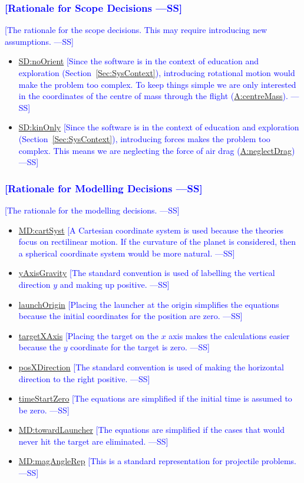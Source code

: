 \documentclass[12pt]{article}
\newcommand{\authornote}[3]{\textcolor{#1}{[#3 ---#2]}}
\newcommand{\authornote}[3]{}
\newcommand{\wss}[1]{\authornote{blue}{SS}{#1}}
\begin{document}
\subsubsection{\wss{Rationale for Scope Decisions}} \label{Sec:SDRationale}

\wss{The rationale for the scope decisions.  This may require introducing
new assumptions.}

\begin{itemize}
\item \hyperref[SD:noOrient]{SD:noOrient} \wss{Since the software is in the
context of education and exploration (Section~\ref{Sec:SysContext}), introducing
rotational motion would make the problem too complex. To keep things simple we
are only interested in the coordinates of the centre of mass through the
flight (\hyperref[centreMass]{A:centreMass}).}
\item \hyperref[SD:kinOnly]{SD:kinOnly} \wss{Since the software is in the
context of education and exploration (Section~\ref{Sec:SysContext}), introducing
forces makes the problem too complex. This means we are neglecting the force of air drag (\hyperref[neglectDrag]{A:neglectDrag})} 
\end{itemize}

\subsubsection{\wss{Rationale for Modelling Decisions}} \label{Sec:MDRationale}

\wss{The rationale for the modelling decisions.}

\begin{itemize}
\item \hyperref[MD:cartSyst]{MD:cartSyst} \wss{A Cartesian coordinate system is
used because the theories focus on rectilinear motion.  If the curvature of the
planet is considered, then a spherical coordinate system would be more natural.}
\item \hyperref[yAxisGravity]{yAxisGravity} \wss{The standard convention is used of labelling the vertical direction $y$ and making up positive.}
\item \hyperref[launchOrigin]{launchOrigin} \wss{Placing the launcher at the origin simplifies the equations because the initial coordinates for the position are zero.}
\item \hyperref[targetXAxis]{targetXAxis} \wss{Placing the target on the $x$ axis makes the calculations easier because the $y$ coordinate for the target is zero.}
\item \hyperref[posXDirection]{posXDirection} \wss{The standard convention is used of making the horizontal direction to the right positive.}
\item \hyperref[timeStartZero]{timeStartZero} \wss{The equations are simplified if the initial time is assumed to be zero.}
\item \hyperref[MD:towardLauncher]{MD:towardLauncher} \wss{The equations are simplified if the cases that would never hit the target are eliminated.}
\item \hyperref[MD:magAngleRep]{MD:magAngleRep} \wss{This is a standard representation for projectile problems.}
\end{itemize}
\end{document}
